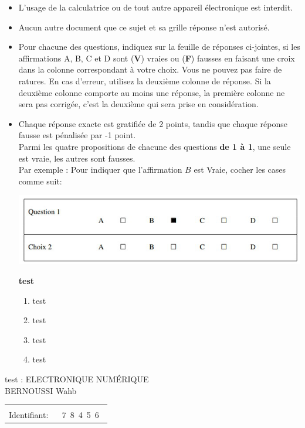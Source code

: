 \documentclass{book}%
\begin{document}
\begin{itemize}%
\item%
L'usage de la calculatrice ou de tout autre appareil électronique est interdit.%
\item%
Aucun autre document que ce sujet et sa grille réponse n'est autorisé.%
\item%
Pour chacune des questions, indiquez sur la feuille de réponses ci-jointes, si les affirmations A, B, C et D sont (\textbf{V}) vraies ou (\textbf{F}) fausses en faisant une croix dans la colonne correspondant à votre choix. Vous ne pouvez pas faire de ratures. En cas d'erreur, utilisez la deuxième colonne de réponse. Si la deuxième colonne comporte au moins une réponse, la première colonne ne sera pas corrigée, c'est la deuxième qui sera prise en considération.%
\item%
Chaque réponse exacte est gratifiée de 2 points, tandis que chaque réponse fausse est pénalisée par -1 point. \\ 	Parmi les quatre propositions de chacune des questions \textbf{de 1 à 1}, une seule est vraie, les autres sont fausses. \\ 	Par exemple : Pour indiquer que l'affirmation $B$ est Vraie, cocher les cases comme suit:  \\ \begin{center}	\includegraphics[scale=0.8]{reponses.png} \end{center}%
\thispagestyle{empty}%
\begin{exercise}%
\textbf{test }%
\begin{enumerate}[label=\textbf{\Alph*. }]%
\item%
test%
\item%
test%
\item%
test%
\item%
test%
\end{enumerate}%
\end{exercise}%
\end{itemize}%
\newpage%
\thispagestyle{empty}%
test : ELECTRONIQUE NUMÉRIQUE $\qquad \qquad \qquad \qquad \qquad \qquad \qquad \qquad$ BERNOUSSI Wahb%
\begin{flushright}%
\begin{tabular}{|l|}%
\hline%
 \\%
\thispagestyle{empty}%
Identifiant: $\quad$ {\Large 7~8~4~5~6~}%
 \\%
\hline%
\end{tabular}%
\end{flushright}%
\end{document}
